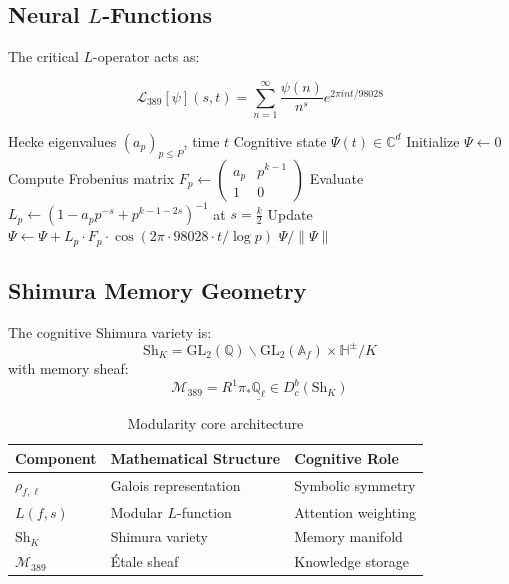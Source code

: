 \documentclass[12pt]{article}
\begin{document}
\subsection{Neural $L$-Functions}
The critical $L$-operator acts as:

\begin{equation}
\mathcal{L}_{389}[\psi](s,t) = \sum_{n=1}^\infty \frac{\psi(n)}{n^s} e^{2\pi i n t/98028}
\end{equation}

\begin{algorithm}[H]
\caption{Modularity Node Activation}
\begin{algorithmic}[1]
\Require Hecke eigenvalues $(a_p)_{p\leq P}$, time $t$
\Ensure Cognitive state $\Psi(t)\in\mathbb{C}^d$
\State Initialize $\Psi \gets 0$
    \State Compute Frobenius matrix $F_p \gets \begin{pmatrix}a_p & p^{k-1}\\ 1 & 0\end{pmatrix}$
    \State Evaluate $L_p \gets (1 - a_p p^{-s} + p^{k-1-2s})^{-1}$ at $s=\frac{k}{2}$
    \State Update $\Psi \gets \Psi + L_p \cdot F_p \cdot \cos(2\pi\cdot 98028\cdot t/\log p)$
\EndFor
\State \Return $\Psi/\|\Psi\|$
\end{algorithmic}
\end{algorithm}

\subsection{Shimura Memory Geometry}
\begin{definition}
The cognitive Shimura variety is:
\[
\mathrm{Sh}_K = \mathrm{GL}_2(\mathbb{Q})\backslash\mathrm{GL}_2(\mathbb{A}_f)\times\mathbb{H}^{\pm}/K
\]
with memory sheaf:
\[
\mathcal{M}_{389} = R^1\pi_*\underline{\mathbb{Q}_\ell}\in D^b_c(\mathrm{Sh}_K)
\]
\end{definition}

\begin{table}[h]
\centering
\begin{tabular}{lll}
\toprule
\textbf{Component} & \textbf{Mathematical Structure} & \textbf{Cognitive Role} \\
\midrule
$\rho_{f,\ell}$ & Galois representation & Symbolic symmetry \\
$L(f,s)$ & Modular $L$-function & Attention weighting \\
$\mathrm{Sh}_K$ & Shimura variety & Memory manifold \\
$\mathcal{M}_{389}$ & Étale sheaf & Knowledge storage \\
\bottomrule
\end{tabular}
\caption{Modularity core architecture}
\end{table}
\end{document}
